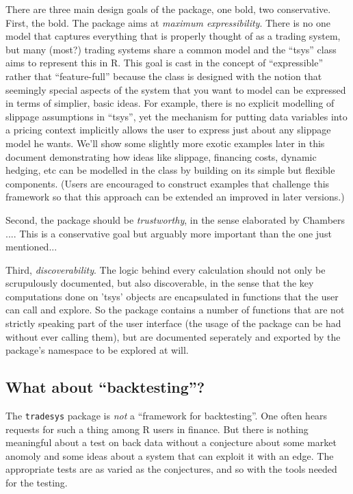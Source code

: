 \documentclass[a4]{article}
\newcommand{\code}[1]{\texttt{#1}}
\begin{document}
There are three main design goals of the package, one bold, two
conservative. First, the bold. The package aims at \emph{maximum
expressibility}. There is no one model that captures everything that
is properly thought of as a trading system, but many (most?) trading
systems share a common model and the ``tsys'' class aims to represent
this in R. This goal is cast in the concept of ``expressible'' rather
that ``feature-full'' because the class is designed with the notion
that seemingly special aspects of the system that you want to model
can be expressed in terms of simplier, basic ideas. For example, there
is no explicit modelling of slippage assumptions in ``tsys'', yet the
mechanism for putting data variables into a pricing context implicitly
allows the user to express just about any slippage model he
wants. We'll show some slightly more exotic examples later in this
document demonstrating how ideas like slippage, financing costs,
dynamic hedging, etc can be modelled in the class by building on its
simple but flexible components. (Users are encouraged to construct
examples that challenge this framework so that this approach can be
extended an improved in later versions.)

Second, the package should be \emph{trustworthy}, in the sense
elaborated by Chambers .... This is a conservative goal but arguably
more important than the one just mentioned...

Third, \emph{discoverability}. The logic behind every calculation
should not only be scrupulously documented, but also discoverable, in
the sense that the key computations done on 'tsys' objects are
encapsulated in functions that the user can call and explore. So the
package contains a number of functions that are not strictly speaking
part of the user interface (the usage of the package can be had
without ever calling them), but are documented seperately and exported
by the package's namespace to be explored at will.

\subsection{What about ``backtesting''?}
The \code{tradesys} package is \emph{not} a ``framework for
backtesting''. One often hears requests for such a thing among R users
in finance. But there is nothing meaningful about a test on back data
without a conjecture about some market anomoly and some ideas about a
system that can exploit it with an edge. The appropriate tests are as
varied as the conjectures, and so with the tools needed for the
testing. 
\end{document}
